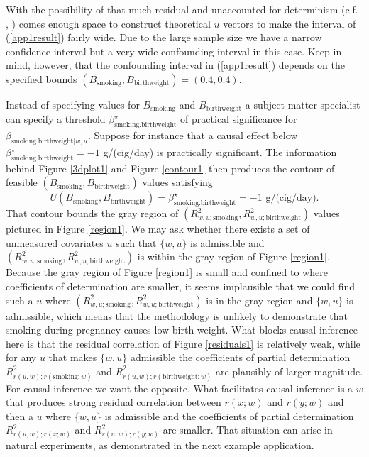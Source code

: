 \documentclass[11pt]{amsart}
\begin{document}
With the possibility of that much residual and unaccounted for determinism (c.f. \citep{PearlDM}, \citep{Knaeble2023}) comes enough space to construct theoretical $u$ vectors to make the interval of (\ref{app1result}) fairly wide. Due to the large sample size we have a narrow confidence interval but a very wide confounding interval in this case. Keep in mind, however, that the confounding interval in (\ref{app1result}) depends on the specified bounds $(B_{\textrm{smoking}},B_{\textrm{birthweight}})=(0.4,0.4)$.

Instead of specifying values for $B_{\textrm{smoking}}$ and $B_{\textrm{birthweight}}$ a subject matter specialist can specify a threshold $\beta^\star_{\textrm{smoking}.\textrm{birthweight}}$ of practical significance for $\beta_{\textrm{smoking}.\textrm{birthweight}|w,u}$. Suppose for instance that a causal effect below $\beta^\star_{\textrm{smoking}.\textrm{birthweight}}=-1$ g/(cig/day) is practically significant. The information behind Figure \ref{3dplot1} and Figure \ref{contour1} then produces the contour of feasible $(B_{\textrm{smoking}},B_{\textrm{birthweight}})$ values satisfying \begin{equation}\label{contoura}U(B_{\textrm{smoking}},B_{\textrm{birthweight}})=\beta^\star_{\textrm{smoking}.\textrm{birthweight}}=-1 \textrm{~g/(cig/day)}.\end{equation} %
That contour bounds the gray region of $(R^2_{w,u;\textrm{smoking}},R^2_{w,u;\textrm{birthweight}})$ values pictured in Figure \ref{region1}. 
We may ask whether there exists a set of unmeasured covariates $u$ such that $\{w,u\}$ is admissible and $(R^2_{w,u;\textrm{smoking}},R^2_{w,u;\textrm{birthweight}})$ is within the gray region of Figure \ref{region1}. Because the gray region of Figure \ref{region1} is small and confined to where coefficients of determination are smaller, it seems implausible that we could find such a $u$ where $(R^2_{w,u;\textrm{smoking}},R^2_{w,u;\textrm{birthweight}})$ is in the gray region and $\{w,u\}$ is admissible, which means that the methodology is unlikely to demonstrate that smoking during pregnancy causes low birth weight. What blocks causal inference here is that the residual correlation of Figure \ref{residuals1} is relatively weak, while for any $u$ that makes $\{w,u\}$ admissible the coefficients of partial determination $R^2_{r(u,w);r(\textrm{smoking};w)}$ and $R^2_{r(u,w);r(\textrm{birthweight};w)}$ are plausibly of larger magnitude. For causal inference we want the opposite. What facilitates causal inference is a $w$ that produces strong residual correlation between $r(x;w)$ and $r(y;w)$ and then a $u$ where $\{w,u\}$ is admissible and the coefficients of partial determination $R^2_{r(u,w);r(x;w)}$ and $R^2_{r(u,w);r(y;w)}$ are smaller. That situation can arise in natural experiments, as demonstrated in the next example application. 
\end{document}
